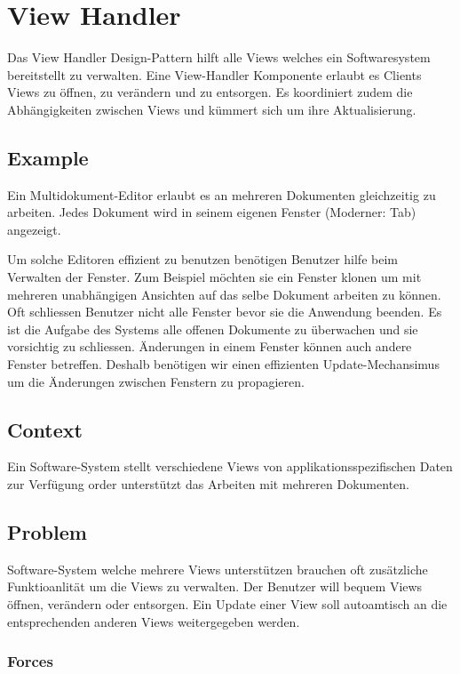 \section{View Handler}


Das View Handler Design-Pattern hilft alle Views welches ein Softwaresystem bereitstellt zu verwalten. Eine View-Handler Komponente erlaubt es Clients Views zu öffnen, zu verändern und zu entsorgen. Es koordiniert zudem die Abhängigkeiten zwischen Views und kümmert sich um ihre Aktualisierung.

\subsection*{Example}


Ein Multidokument-Editor erlaubt es an mehreren Dokumenten gleichzeitig zu arbeiten. Jedes Dokument wird in seinem eigenen Fenster (Moderner: Tab) angezeigt.

Um solche Editoren effizient zu benutzen benötigen Benutzer hilfe beim Verwalten der Fenster. Zum Beispiel möchten sie ein Fenster klonen um mit mehreren unabhängigen Ansichten auf das selbe Dokument arbeiten zu können. Oft schliessen Benutzer nicht alle Fenster bevor sie die Anwendung beenden. Es ist die Aufgabe des Systems alle offenen Dokumente zu überwachen und sie vorsichtig zu schliessen. Änderungen in einem Fenster können auch andere Fenster betreffen. Deshalb benötigen wir einen effizienten Update-Mechansimus um die Änderungen zwischen Fenstern zu propagieren.

\subsection*{Context}


Ein Software-System stellt verschiedene Views von applikationsspezifischen Daten zur Verfügung order unterstützt das Arbeiten mit mehreren Dokumenten.

\subsection*{Problem}


Software-System welche mehrere Views unterstützen brauchen oft zusätzliche Funktioanlität um die Views zu verwalten. Der Benutzer will bequem Views öffnen, verändern oder entsorgen. Ein Update einer View soll autoamtisch an die entsprechenden anderen Views weitergegeben werden.

\subsubsection*{Forces}


